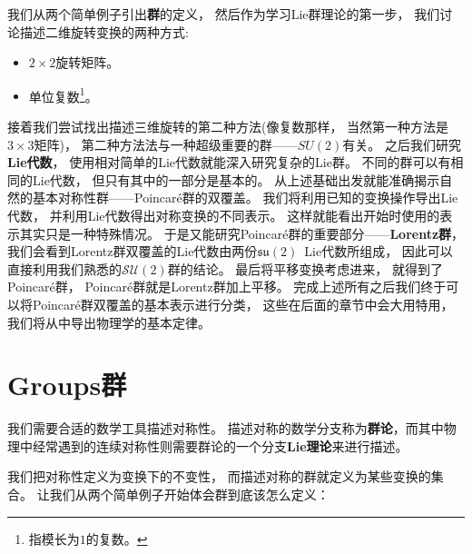 我们从两个简单例子引出{\bf{群}}的定义， 然后作为学习Lie群理论的第一步， 我们讨论描述二维旋转变换的两种方式:
\begin{itemize}
	\item $2 \times 2$旋转矩阵。
	\item 单位复数\footnote{指模长为$1$的复数。}。
\end{itemize}
接着我们尝试找出描述三维旋转的第二种方法(像复数那样， 当然第一种方法是$3\times3$矩阵)， 第二种方法法与一种超级重要的群——{\bf{$SU(2)$}}有关。 之后我们研究{\bf{Lie代数}}， 使用相对简单的Lie代数就能深入研究复杂的Lie群。 不同的群可以有相同的Lie代数， 但只有其中的一部分是基本的。
从上述基础出发就能准确揭示自然的基本对称性群——Poincar\'e群的双覆盖。
我们将利用已知的变换操作导出Lie代数， 并利用Lie代数得出对称变换的不同表示。 这样就能看出开始时使用的表示其实只是一种特殊情况。 于是又能研究Poincar\'e群的重要部分——{\bf{Lorentz群}}， 我们会看到Lorentz群双覆盖的Lie代数由两份$\mathfrak{su}(2)$\, Lie代数所组成， 因此可以直接利用我们熟悉的$\mathcal{SU}(2)$群的结论。 最后将平移变换考虑进来， 就得到了Poincar\'e群， Poincar\'e群就是Lorentz群加上平移。 完成上述所有之后我们终于可以将Poincar\'e群双覆盖的基本表示进行分类， 这些在后面的章节中会大用特用， 我们将从中导出物理学的基本定律。

\section[群]{Groups\quad 群}
\label{sec3.1}
我们需要合适的数学工具描述对称性。 描述对称的数学分支称为{\bf{群论}}，而其中物理中经常遇到的连续对称性则需要群论的一个分支{\bf{Lie理论}}来进行描述。

我们把对称性定义为变换下的不变性， 而描述对称的群就定义为某些变换的集合。 让我们从两个简单例子开始体会群到底该怎么定义：




